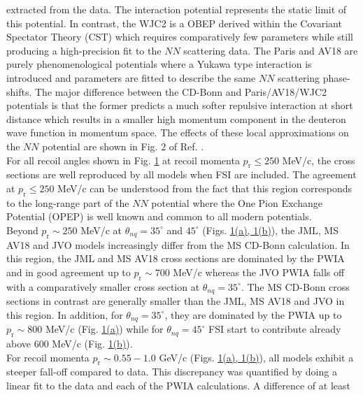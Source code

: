 \documentclass[aps,prl,twocolumn,showpacs,superscriptaddress,groupedaddress]{revtex4-2}  %
\begin{document}
extracted from the data. The interaction potential represents the static limit of 
this potential. In contrast, the WJC2 is a OBEP derived within the Covariant Spectator Theory (CST) \cite{PhysRev.186.1448, PhysRevD.10.223, PhysRevC.26.2203, PhysRevC.26.2226}
which requires comparatively few parameters while still producing a high-precision fit to the $NN$ scattering data.
The Paris and AV18 are purely phenomenological potentials where a 
Yukawa type interaction is introduced and parameters are fitted to describe the 
same $NN$ scattering phase-shifts. The major difference between the CD-Bonn and Paris/AV18/WJC2 
potentials is that the former predicts a much softer repulsive interaction at short distance which 
results in a smaller high momentum component in the deuteron wave function in momentum space.
The effects of these local approximations on the $NN$ potential are shown in Fig. 2 of Ref. \cite{PhysRevC.63.024001}.\\
\indent For all recoil angles shown in Fig. \hyperref[fig:fig1]{1} at recoil momenta $p_{\mathrm{r}}\leq250$ MeV/c, the cross sections are well reproduced by all models when FSI are included.
The agreement at $p_{\mathrm{r}}\leq250$ MeV/c can be understood from the fact that this region corresponds to the long-range part of the $NN$ potential where the One Pion Exchange Potential (OPEP)
is well known and common to all modern potentials. \\
\indent Beyond $p_{\mathrm{r}}\sim250$ MeV/c at $\theta_{nq}=35^{\circ}$ and $45^{\circ}$ (Figs. \hyperref[fig:fig1]{1(a), 1(b)}), the JML,
MS AV18 and JVO models increasingly differ from the MS CD-Bonn calculation. In this region, the JML and MS AV18 cross sections are dominated by the PWIA and in good agreement up to $p_{\mathrm{r}}\sim700$ MeV/c whereas
the JVO PWIA falls off with a comparatively smaller cross section at $\theta_{nq}=35^{\circ}$. The MS CD-Bonn cross sections in contrast are generally smaller than the JML, MS AV18 and JVO in this region.
In addition, for $\theta_{nq}=35^{\circ}$, they are dominated by the PWIA up to $p_{\mathrm{r}}\sim800$ MeV/c
(Fig. \hyperref[fig:fig1]{1(a)}) while for $\theta_{nq}=45^{\circ}$ FSI start to contribute already above 600 MeV/c (Fig. \hyperref[fig:fig1]{1(b)}).\\
\indent For recoil momenta $p_{\mathrm{r}} \sim 0.55-1.0$ GeV/c (Figs. \hyperref[fig:fig1]{1(a), 1(b)}), all models exhibit a
steeper fall-off compared to data. This discrepancy was quantified by doing a linear fit to the data and each of the PWIA calculations. A difference of at least
\end{document}
